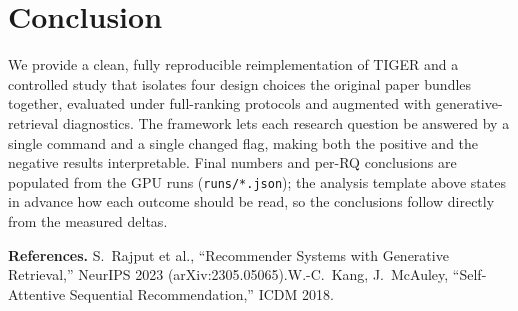 \documentclass[10pt]{article}
\begin{document}
\section{Conclusion}
We provide a clean, fully reproducible reimplementation of TIGER and a controlled
study that isolates four design choices the original paper bundles together,
evaluated under full-ranking protocols and augmented with
generative-retrieval diagnostics. The framework lets each research question be
answered by a single command and a single changed flag, making both the positive
and the negative results interpretable. Final numbers and per-RQ conclusions are
populated from the GPU runs (\texttt{runs/*.json}); the analysis template above
states in advance how each outcome should be read, so the conclusions follow
directly from the measured deltas.

\vspace{0.3em}
{\footnotesize \textbf{References.} S.\ Rajput et al., ``Recommender Systems with
Generative Retrieval,'' NeurIPS 2023 (arXiv:2305.05065).\quad W.-C.\ Kang, J.\
McAuley, ``Self-Attentive Sequential Recommendation,'' ICDM 2018.}
\end{document}
